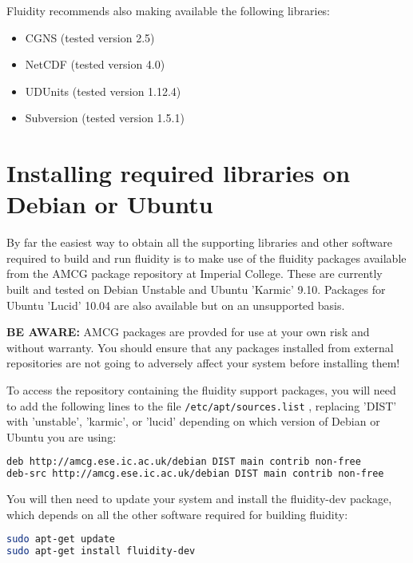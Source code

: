 Fluidity recommends also making available the following libraries:

\begin{itemize}
\item CGNS (tested version 2.5)
\item NetCDF (tested version 4.0)
\item UDUnits (tested version 1.12.4)
\item Subversion (tested version 1.5.1)
\end{itemize}

\section{Installing required libraries on Debian or Ubuntu}
\label{sect:required_ḻibraries_debian}

By far the easiest way to obtain all the supporting libraries and other
software required to build and run fluidity is to make use of the fluidity
packages available from the AMCG package repository at Imperial College. These
are currently built and tested on Debian Unstable and Ubuntu 'Karmic' 9.10.
Packages for Ubuntu 'Lucid' 10.04 are also available but on an unsupported
basis.

\textbf{BE AWARE:} AMCG packages are provded for use at your own risk and
without warranty. You should ensure that any packages installed from external
repositories are not going to adversely affect your system before installing
them!

To access the repository containing the fluidity support packages, you will
need to add the following lines to the file
\lstinline[language=bash]+/etc/apt/sources.list+ , replacing 'DIST' with
'unstable', 'karmic', or 'lucid' depending on which version of Debian or Ubuntu
you are using:

\begin{lstlisting}[language=bash]
deb http://amcg.ese.ic.ac.uk/debian DIST main contrib non-free
deb-src http://amcg.ese.ic.ac.uk/debian DIST main contrib non-free
\end{lstlisting}

You will then need to update your system and install the fluidity-dev package,
which depends on all the other software required for building fluidity:

\begin{lstlisting}[language=bash]
sudo apt-get update
sudo apt-get install fluidity-dev
\end{lstlisting}


